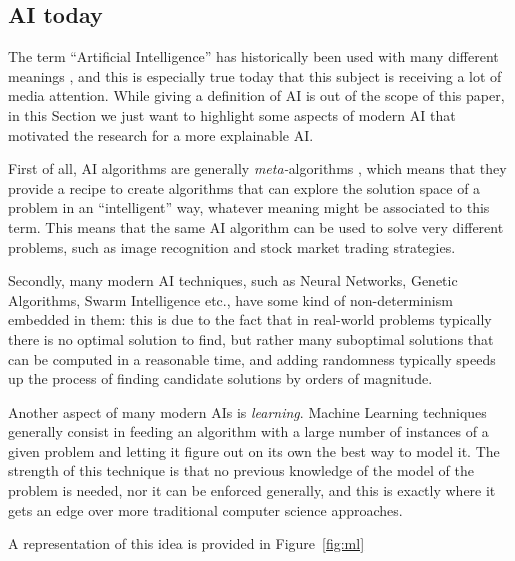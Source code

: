 \documentclass[conference]{IEEEtran}
\newcommand{\cit}[1][]{\todo[tickmarkheight=0.2cm]{cit #1}}
\begin{document}

\subsection{AI today}
\label{sec:aiprog}

The term ``Artificial Intelligence'' has historically been used with many different meanings \cit, and this is especially true today that this subject is receiving a lot of media attention. While giving a definition of AI is out of the scope of this paper, in this Section we just want to highlight some aspects of modern AI that motivated the research for a more explainable AI.

First of all, AI algorithms are generally \textit{meta-}algorithms \cit, which means that they provide a recipe to create algorithms that can explore the solution space of a problem in an ``intelligent'' way, whatever meaning might be associated to this term. This means that the same AI algorithm can be used to solve very different problems, such as image recognition and stock market trading strategies.

Secondly, many modern AI techniques, such as Neural Networks, Genetic Algorithms, Swarm Intelligence etc., have some kind of non-determinism embedded in them: this is due to the fact that in real-world problems typically there is no optimal solution to find, but rather many suboptimal solutions that can be computed in a reasonable time, and adding randomness typically speeds up the process of finding candidate solutions by orders of magnitude.

Another aspect of many modern AIs is \textit{learning}. Machine Learning
techniques generally consist in feeding an algorithm  with a large
number of instances of a given problem and letting it figure out on its own the
best way to model it. The strength of this technique is that no previous
knowledge of the model of the problem is needed, nor it can be enforced
generally, and this is exactly where it gets an edge over more
traditional computer science approaches.

A representation of this idea is provided in Figure~\ref{fig:ml}
\end{document}
